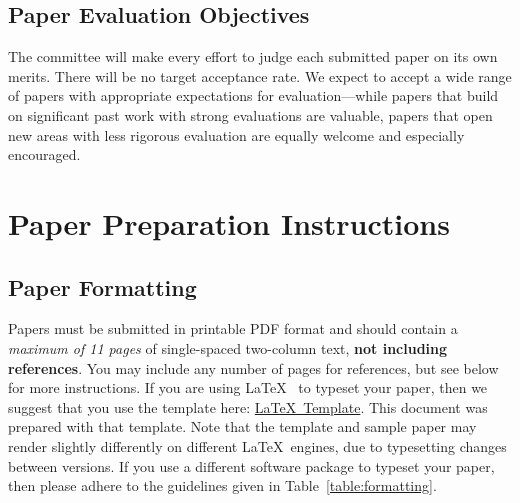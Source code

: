 \documentclass{sig-alternate}
\begin{document}
\subsection{Paper Evaluation Objectives} 
The committee will make every effort to judge each submitted paper on its own merits. There will be no target acceptance rate. We expect to accept a wide range of papers with appropriate expectations for evaluation---while papers that build on significant past work with strong evaluations are valuable, papers that open new areas with less rigorous evaluation are equally welcome and especially encouraged.

\section{Paper Preparation Instructions}

\subsection{Paper Formatting}

Papers must be submitted in printable PDF format and should contain a {\em maximum of 11 pages} of single-spaced two-column text, {\bf not including references}.  You may include any number of pages for references, but see below for more instructions.  If you are using \LaTeX~\cite{lamport94} to typeset your paper, then we suggest that you use the template here: \href{https://www.microarch.org/micro56/submit/micro56-latex-template.zip}{\LaTeX~Template}. This document was prepared with that template. Note that the template and sample paper may render slightly differently on different \LaTeX~engines, due to typesetting changes between versions. If you use a different software package to typeset your paper, then please adhere to the guidelines given in Table~\ref{table:formatting}. 
\end{document}
